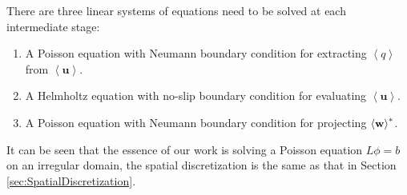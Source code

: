 There are three linear systems of equations need to be solved at each
intermediate stage:
\begin{enumerate}
\item A Poisson equation with Neumann boundary condition for
  extracting $\left<q\right>$ from $\left<\mathbf{u}\right>$.
\item A Helmholtz equation with no-slip boundary condition for
  evaluating $\left<\mathbf{u}\right>$.
\item A Poisson equation with Neumann boundary condition for
  projecting $\left<{\mathbf{w}}\right>^*$.
\end{enumerate}

It can be seen that the essence of our work is solving a Poisson equation
$L\phi=b$ on
an irregular domain, the spatial discretization is  the same as that
in Section \ref{sec:SpatialDiscretization}.

